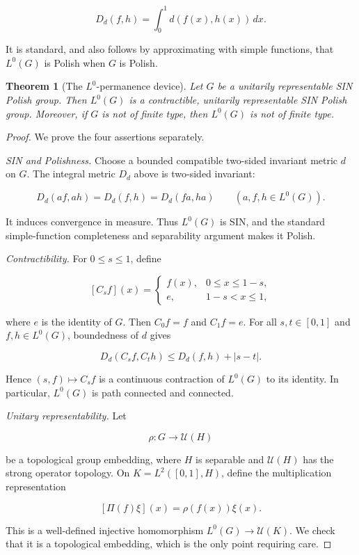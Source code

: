 \documentclass[11pt]{article}
\newtheorem{theorem}{Theorem}
\newcommand{\U}{\mathcal U}
\begin{document}
\[
 D_d(f,h)=\int_0^1 d(f(x),h(x))\,dx.
\]

It is standard, and also follows by approximating with simple functions,
that \(L^0(G)\) is Polish when \(G\) is Polish.

\begin{theorem}[The \(L^0\)-permanence device]\label{thm:device}
Let \(G\) be a unitarily representable SIN Polish group.  Then \(L^0(G)\)
is a contractible, unitarily representable SIN Polish group.  Moreover, if
\(G\) is not of finite type, then \(L^0(G)\) is not of finite type.
\end{theorem}

\begin{proof}
We prove the four assertions separately.

\smallskip
\noindent\emph{SIN and Polishness.}
Choose a bounded compatible two-sided invariant metric \(d\) on \(G\).  The
integral metric \(D_d\) above is two-sided invariant:

\[
 D_d(af,ah)=D_d(f,h)=D_d(fa,ha)
 \qquad(a,f,h\in L^0(G)).
\]

It induces convergence in measure.  Thus \(L^0(G)\) is SIN, and the standard
simple-function completeness and separability argument makes it Polish.

\smallskip
\noindent\emph{Contractibility.}
For \(0\leq s\leq1\), define

\[
 [C_s f](x)=
 \begin{cases}
 f(x),&0\leq x\leq1-s,\\
 e,&1-s<x\leq1,
 \end{cases}
\]

where \(e\) is the identity of \(G\).  Then \(C_0f=f\) and \(C_1f=e\).
For all \(s,t\in[0,1]\) and \(f,h\in L^0(G)\), boundedness of \(d\) gives

\[
 D_d(C_sf,C_th)\leq D_d(f,h)+|s-t|.
\]

Hence \((s,f)\mapsto C_sf\) is a continuous contraction of \(L^0(G)\) to
its identity.  In particular, \(L^0(G)\) is path connected and connected.

\smallskip
\noindent\emph{Unitary representability.}
Let

\[
 \rho:G\longrightarrow\U(H)
\]

be a topological group embedding, where \(H\) is separable and
\(\U(H)\) has the strong operator topology.  On
\(K=L^2([0,1],H)\), define the multiplication representation

\[
 [\Pi(f)\xi](x)=\rho(f(x))\xi(x).
\]

This is a well-defined injective homomorphism \(L^0(G)\to\U(K)\).  We check
that it is a topological embedding, which is the only point requiring care.


\end{proof}
\end{document}
